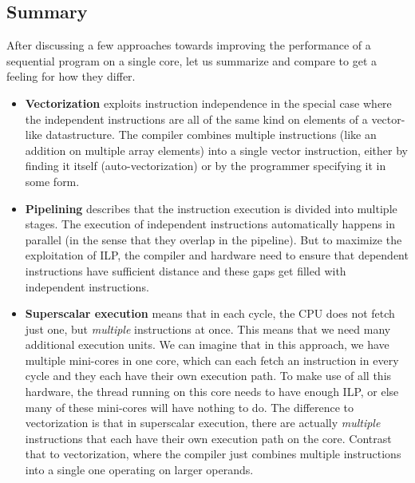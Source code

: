 \documentclass[main.tex]{subfiles}
\begin{document}
\subsection{Summary}
After discussing a few approaches towards improving the performance of a sequential program on a single core, let us summarize and compare to get a feeling for how they differ.
\begin{itemize}
  \item \textbf{Vectorization} exploits instruction independence in the special case where the independent instructions are all of the same kind on elements of a vector-like datastructure. The compiler combines multiple instructions (like an addition on multiple array elements) into a single vector instruction, either by finding it itself (auto-vectorization) or by the programmer specifying it in some form.
  \item \textbf{Pipelining} describes that the instruction execution is divided into multiple stages. The execution of independent instructions automatically happens in parallel (in the sense that they overlap in the pipeline). But to maximize the exploitation of ILP, the compiler and hardware need to ensure that dependent instructions have sufficient distance and these gaps get filled with independent instructions.
  \item \textbf{Superscalar execution} means that in each cycle, the CPU does not fetch just one, but \textit{multiple} instructions at once. This means that we need many additional execution units. We can imagine that in this approach, we have multiple mini-cores in one core, which can each fetch an instruction in every cycle and they each have their own execution path. To make use of all this hardware, the thread running on this core needs to have enough ILP, or else many of these mini-cores will have nothing to do. The difference to vectorization is that in superscalar execution, there are actually \textit{multiple} instructions that each have their own execution path on the core. Contrast that to vectorization, where the compiler just combines multiple instructions into a single one operating on larger operands.
\end{itemize}
\end{document}
